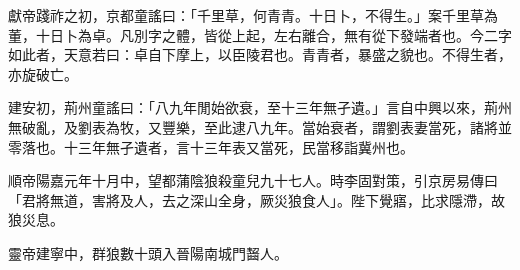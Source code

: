 \begin{pinyinscope}
獻帝踐祚之初，京都童謠曰：「千里草，何青青。十日卜，不得生。」案千里草為董，十日卜為卓。凡別字之體，皆從上起，左右離合，無有從下發端者也。今二字如此者，天意若曰：卓自下摩上，以臣陵君也。青青者，暴盛之貌也。不得生者，亦旋破亡。

建安初，荊州童謠曰：「八九年閒始欲衰，至十三年無孑遺。」言自中興以來，荊州無破亂，及劉表為牧，又豐樂，至此逮八九年。當始衰者，謂劉表妻當死，諸將並零落也。十三年無孑遺者，言十三年表又當死，民當移詣冀州也。

順帝陽嘉元年十月中，望都蒲陰狼殺童兒九十七人。時李固對策，引京房易傳曰「君將無道，害將及人，去之深山全身，厥災狼食人」。陛下覺寤，比求隱滯，故狼災息。

靈帝建寧中，群狼數十頭入晉陽南城門齧人。


\end{pinyinscope}